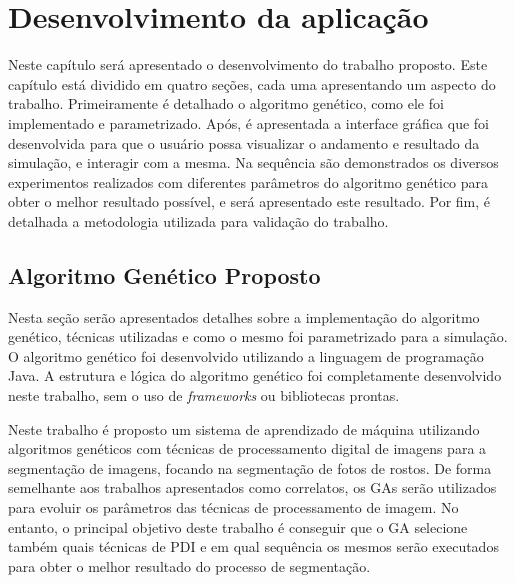 \documentclass[12pt,oneside,a4paper,english,french,spanish,brazil,]{abntex2}
\begin{document}
\chapter{Desenvolvimento da aplicação}
\label{chap:Desenvolvimento}

Neste capítulo será apresentado o desenvolvimento do trabalho proposto. Este capítulo está dividido em quatro seções, cada uma apresentando um aspecto do trabalho. Primeiramente é detalhado o algoritmo genético, como ele foi implementado e parametrizado. Após, é apresentada a interface gráfica que foi desenvolvida para que o usuário possa visualizar o andamento e resultado da simulação, e interagir com a mesma. Na sequência são demonstrados os diversos experimentos realizados com diferentes parâmetros do algoritmo genético para obter o melhor resultado possível, e será apresentado este resultado. Por fim, é detalhada a metodologia utilizada para validação do trabalho.

\section{Algoritmo Genético Proposto}

Nesta seção serão apresentados detalhes sobre a implementação do algoritmo genético, técnicas utilizadas e como o mesmo foi parametrizado para a simulação. O algoritmo genético foi desenvolvido utilizando a linguagem de programação Java. A estrutura e lógica do algoritmo genético foi completamente desenvolvido neste trabalho, sem o uso de \textit{frameworks} ou bibliotecas prontas.

Neste trabalho é proposto um sistema de aprendizado de máquina utilizando algoritmos genéticos com técnicas de processamento digital de imagens para a segmentação de imagens, focando na segmentação de fotos de rostos. De forma semelhante aos trabalhos apresentados como correlatos, os GAs serão utilizados para evoluir os parâmetros das técnicas de processamento de imagem. No entanto, o principal objetivo deste trabalho é conseguir que o GA selecione também quais técnicas de PDI e em qual sequência os mesmos serão executados para obter o melhor resultado do processo de segmentação.
\end{document}
